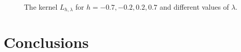 \documentclass[11pt,a4paper,twoside,bibtotoc]{scrartcl}
\theoremstyle{plain}
\theoremstyle{definition}
\theoremstyle{remark}
\numberwithin{equation}{section}
\numberwithin{table}{section}
\numberwithin{figure}{section}
\begin{document}
\begin{figure}[tb]
  \centering
   \hfill
   \\
   \hfill
  \caption{The kernel $L_{h,\lambda}$ for $h = -0.7, -0.2, 0.2, 0.7$ and different values of $\lambda$.}
  \label{Basics:Figure:LKernel}
\end{figure}

\section{Conclusions}





%
%
\end{document}
